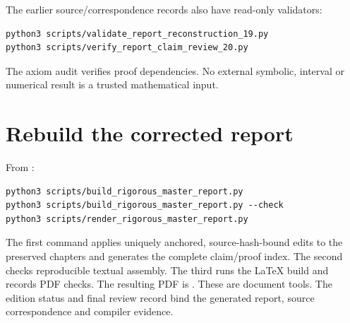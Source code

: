 The earlier source/correspondence records also have read-only validators:
\begin{verbatim}
python3 scripts/validate_report_reconstruction_19.py
python3 scripts/verify_report_claim_review_20.py
\end{verbatim}
The axiom audit verifies proof dependencies. No external symbolic, interval or numerical result is a trusted mathematical input.



\section{Rebuild the corrected report}\label{rebuild-the-report}

From :
\begin{verbatim}
python3 scripts/build_rigorous_master_report.py
python3 scripts/build_rigorous_master_report.py --check
python3 scripts/render_rigorous_master_report.py
\end{verbatim}
The first command applies uniquely anchored, source-hash-bound edits to the preserved chapters and generates the complete claim/proof index. The second checks reproducible textual assembly. The third runs the LaTeX build and records PDF checks. The resulting PDF is . These are document tools. The edition status and final review record bind the generated report, source correspondence and compiler evidence.


